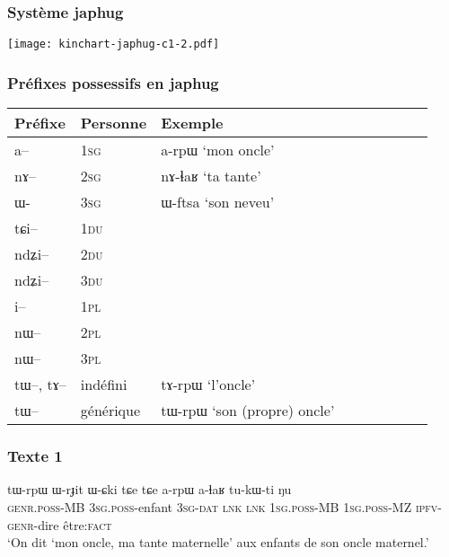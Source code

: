 \documentclass[xcolor=table]{beamer}
\newcommand{\ipa}[1]{{\phon #1}} %
\begin{document}
  \begin{frame} 
 \frametitle{Système japhug} 
\texttt{[image: kinchart-japhug-c1-2.pdf]}
\end{frame}
  \begin{frame} 
 \frametitle{Préfixes possessifs en japhug} 
 \begin{tabular}{lllllllll} 
\toprule
 Préfixe & Personne & Exemple\\
\midrule
\ipa{a--}  & 1\textsc{sg} & \ipa{a-rpɯ} `mon oncle' \\
\ipa{nɤ--}  & 2\textsc{sg} & \ipa{nɤ-ɬaʁ} `ta tante' \\
\ipa{ɯ-}		& 3\textsc{sg} & \ipa{ɯ-ftsa} `son neveu'\\
\midrule
\ipa{tɕi--}  &	 1\textsc{du}  \\
\ipa{ndʑi--}  & 2\textsc{du} \\	
\ipa{ndʑi--}  & 3\textsc{du} \\	
\midrule
\ipa{i--}  & 1\textsc{pl} \\
\ipa{nɯ--}  & 2\textsc{pl} \\
\ipa{nɯ--}  & 3\textsc{pl} \\
\midrule
\ipa{tɯ--},  \ipa{tɤ--} & indéfini & \ipa{tɤ-rpɯ} `l'oncle'\\
\ipa{tɯ--}   &  générique & \ipa{tɯ-rpɯ} `son (propre) oncle'\\
\bottomrule
\end{tabular}
\end{frame}

  \begin{frame} 
 \frametitle{Texte 1} 
 \begin{exe}
\ex 
\gll 
 \ipa{tɯ-rpɯ} 	\ipa{ɯ-rɟit} 	\ipa{ɯ-ɕki} 	\ipa{tɕe} 	\ipa{tɕe} 	\ipa{a-rpɯ} \ipa{a-ɬaʁ} 	\ipa{tu-kɯ-ti} 	\ipa{ŋu}  \\
 \textsc{genr.poss}-MB \textsc{3sg.poss}-enfant \textsc{3sg-dat} \textsc{lnk}  \textsc{lnk}  \textsc{1sg.poss}-MB \textsc{1sg.poss}-MZ \textsc{ipfv-genr}-dire être:\textsc{fact} \\
\glt `On dit `mon oncle, ma tante maternelle' aux enfants de son oncle maternel.'
\end{exe}

\end{frame}
\end{document}
